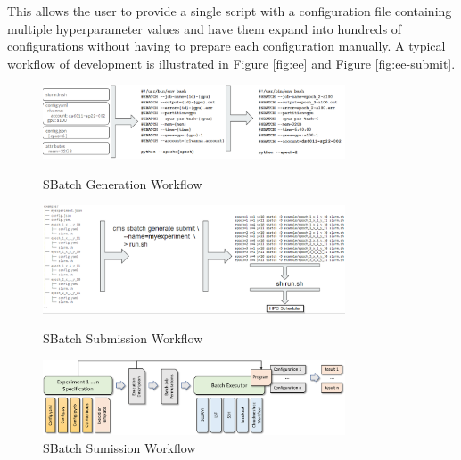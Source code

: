 This allows the user to provide a single script with a configuration file containing multiple hyperparameter values and have them expand into hundreds of configurations without having to prepare each configuration manually.
A typical workflow of development is illustrated in Figure \ref{fig:ee} and Figure \ref{fig:ee-submit}.

\begin{figure}[htb]
    \centering
    \includegraphics[width=0.8\textwidth]{images/sbatch-template.png}
    \caption{SBatch Generation Workflow}\label{fig:ee}

    \centering
    \includegraphics[width=0.8\textwidth]{images/sbatch-submit.png}
    \caption{SBatch Submission Workflow}\label{fig:ee-submit}

    \centering
    \includegraphics[width=0.8\textwidth]{images/sbatch.pdf}
    \caption{SBatch Sumission Workflow}\label{fig:sbatch-2}
\end{figure}



